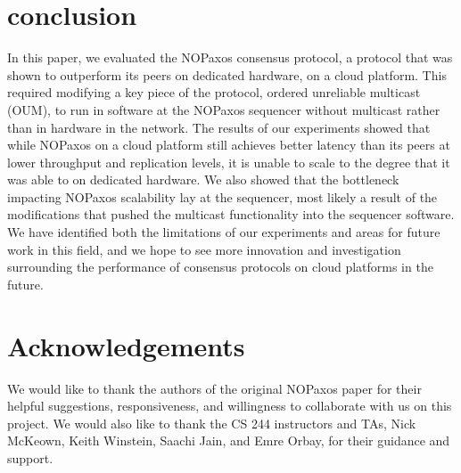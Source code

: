 \section{conclusion}

In this paper, we evaluated the NOPaxos consensus protocol, a protocol that was shown to outperform its peers on dedicated hardware, on a cloud platform. This required modifying a key piece of the protocol, ordered unreliable multicast (OUM), to run in software at the NOPaxos sequencer without multicast rather than in hardware in the network. The results of our experiments showed that while NOPaxos on a cloud platform still achieves better latency than its peers at lower throughput and replication levels, it is unable to scale to the degree that it was able to on dedicated hardware. We also showed that the bottleneck impacting NOPaxos scalability lay at the sequencer, most likely a result of the modifications that pushed the multicast functionality into the sequencer software. We have identified both the limitations of our experiments and areas for future work in this field, and we hope to see more innovation and investigation surrounding the performance of consensus protocols on cloud platforms in the future.  

\section{Acknowledgements}

We would like to thank the authors of the original NOPaxos paper for their helpful suggestions, responsiveness, and willingness to collaborate with us on this project. We would also like to thank the CS 244 instructors and TAs, Nick McKeown, Keith Winstein, Saachi Jain, and Emre Orbay, for their guidance and support.

